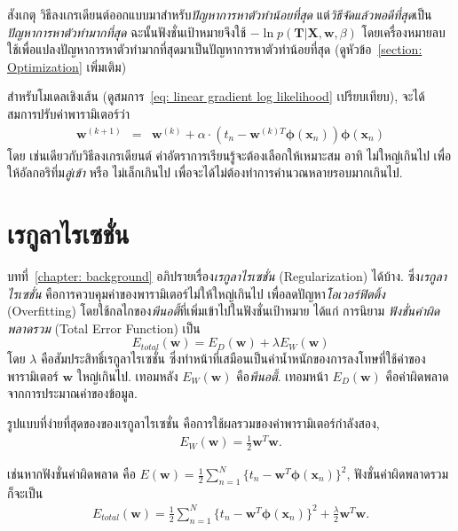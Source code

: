 สังเกตุ วิธีลงเกรเดียนต์ออกแบบมาสำหรับ\textit{ปัญหาการหาตัวทำน้อยที่สุด} 
แต่\textit{วิธีจัดแล้วพอดีที่สุด}เป็น\textit{ปัญหาการหาตัวทำมากที่สุด}
ฉะนั้นฟังชั่นเป้าหมายจึงใช้ $- \ln p(\mathbf{T}|\mathbf{X}, \mathbf{w}, \beta)$ 
โดยเครื่องหมายลบใช้เพื่อแปลงปัญหาการหาตัวทำมากที่สุดมาเป็นปัญหาการหาตัวทำน้อยที่สุด (ดูหัวข้อ~\ref{section: Optimization} เพิ่มเติม)


สำหรับโมเดลเชิงเส้น (ดูสมการ~\ref{eq: linear gradient log likelihood} เปรียบเทียบ),
จะได้สมการปรับค่าพารามิเตอร์ว่า
\begin{eqnarray}
   \mathbf{w}^{(k+1)} &=& \mathbf{w}^{(k)} + \alpha \cdot \left(  t_n - \mathbf{w}^{(k) T} \bm{\phi}(\mathbf{x}_n) \right) \bm{\phi}(\mathbf{x}_n)
\label{eq: linear w online linear model}
\end{eqnarray}
โดย เช่นเดียวกับวิธีลงเกรเดียนต์ ค่าอัตราการเรียนรู้จะต้องเลือกให้เหมาะสม 
อาทิ ไม่ใหญ่เกินไป เพื่อให้อัลกอริทึ่ม\textit{ลู่เข้า} 
หรือ ไม่เล็กเกินไป เพื่อจะได้ไม่ต้องทำการคำนวณหลายรอบมากเกินไป. %

\section{เรกูลาไรเซชั่น}
\label{sec: regularization}

บทที่~\ref{chapter: background} อภิปรายเรื่อง\textit{เรกูลาไรเซชั่น} (Regularization) ได้บ้าง. ซึ่ง\textit{เรกูลาไรเซชั่น} คือการควบคุมค่าของพารามิเตอร์ไม่ให้ใหญ่เกินไป เพื่อลดปัญหา\textit{โอเวอร์ฟิตติ้ง} (Overfitting)
โดยใช้กลไกของ\textit{พีนอตี้}ที่เพิ่มเข้าไปในฟังชั่นเป้าหมาย ได้แก่ การนิยาม \textit{ฟังชั่นค่าผิดพลาดรวม} (Total Error Function) เป็น
\[
  E_{total}(\mathbf{w}) = E_D(\mathbf{w}) + \lambda E_W(\mathbf{w})
\]
โดย $\lambda$ คือสัมประสิทธิ์เรกูลาไรเซชั่น ซึ่งทำหน้าที่เสมือนเป็นค่าน้ำหนักของการลงโทษที่ใช้ค่าของพารามิเตอร์ $\mathbf{w}$ ใหญ่เกินไป.
เทอมหลัง $E_W(\mathbf{w})$ คือ\textit{พีนอตี้}.
เทอมหน้า $E_D(\mathbf{w})$ คือค่าผิดพลาดจากการประมาณค่าของข้อมูล.

รูปแบบที่ง่ายที่สุดของของเรกูลาไรเซชั่น คือการใช้ผลรวมของค่าพารามิเตอร์กำลังสอง,
%
\begin{eqnarray}
  E_W(\mathbf{w}) = \frac{1}{2} \mathbf{w}^T \mathbf{w}.
\label{eq: linear w regularizer}
\end{eqnarray}

เช่นหากฟังชั่นค่าผิดพลาด คือ $E(\mathbf{w}) = \frac{1}{2} \sum_{n=1}^N \{ t_n - \mathbf{w}^T \bm{\phi}(\mathbf{x}_n)\}^2$, ฟังชั่นค่าผิดพลาดรวม ก็จะเป็น
\begin{eqnarray}
   E_{total}(\mathbf{w}) = \frac{1}{2} \sum_{n=1}^N \{ t_n - \mathbf{w}^T \bm{\phi} (\mathbf{x}_n)\}^2 + \frac{\lambda}{2} \mathbf{w}^T \mathbf{w}.
\label{eq: linear total error function}
\end{eqnarray}

